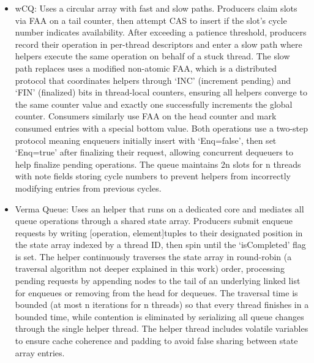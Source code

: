 \begin{itemize}
   \item wCQ: Uses a circular array with fast and slow paths. Producers claim slots via \ac{FAA} on a tail counter, then attempt \ac{CAS} to insert if the slot's cycle number indicates availability. After exceeding a patience threshold, producers record their operation in per-thread descriptors and enter a slow path where helpers execute the same operation on behalf of a stuck thread. The slow path replaces uses a modified non-atomic \ac{FAA}, which is a distributed protocol that coordinates helpers through \enquote*{INC} (increment pending) and \enquote*{FIN} (finalized) bits in thread-local counters, ensuring all helpers converge to the same counter value and exactly one successfully increments the global counter. Consumers similarly use \ac{FAA} on the head counter and mark consumed entries with a special bottom value. Both operations use a two-step protocol meaning enqueuers initially insert with \enquote*{Enq=false}, then set \enquote*{Enq=true} after finalizing their request, allowing concurrent dequeuers to help finalize pending operations. The queue maintains 2n slots for n threads with note fields storing cycle numbers to prevent helpers from incorrectly modifying entries from previous cycles. \cite{wCQWaitFreeQueue}
   \item Verma Queue: Uses an helper that runs on a dedicated core and mediates all queue operations through a shared state array. Producers submit enqueue requests by writing [operation, element]tuples to their designated position in the state array indexed by a thread ID, then spin until the \enquote*{isCompleted} flag is set. The helper continuously traverses the state array in round-robin (a traversal algorithm not deeper explained in this work) order, processing pending requests by appending nodes to the tail of an underlying linked list for enqueues or removing from the head for dequeues. The traversal time is bounded (at most n iterations for n threads) so that every thread finishes in a bounded time, while contention is eliminated by serializing all queue changes through the single helper thread. The helper thread includes volatile variables to ensure cache coherence and padding to avoid false sharing between state array entries. \cite{Verma2013Scalable}
\end{itemize}
